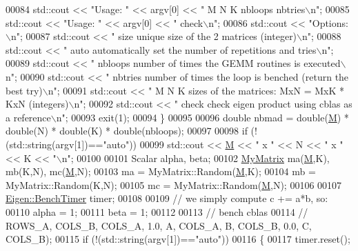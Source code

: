 \begin{DoxyCode}
{{{00084     std::cout << \textcolor{stringliteral}{"Usage: "} << argv[0] << \textcolor{stringliteral}{" M N K nbloops nbtries\(\backslash\)n"};
00085     std::cout << \textcolor{stringliteral}{"Usage: "} << argv[0] << \textcolor{stringliteral}{" check\(\backslash\)n"};
00086     std::cout << \textcolor{stringliteral}{"Options:\(\backslash\)n"};
00087     std::cout << \textcolor{stringliteral}{"    size       unique size of the 2 matrices (integer)\(\backslash\)n"};
00088     std::cout << \textcolor{stringliteral}{"    auto       automatically set the number of repetitions and tries\(\backslash\)n"};
00089     std::cout << \textcolor{stringliteral}{"    nbloops    number of times the GEMM routines is executed\(\backslash\)n"};
00090     std::cout << \textcolor{stringliteral}{"    nbtries    number of times the loop is benched (return the best try)\(\backslash\)n"};
00091     std::cout << \textcolor{stringliteral}{"    M N K      sizes of the matrices: MxN  =  MxK * KxN (integers)\(\backslash\)n"};
00092     std::cout << \textcolor{stringliteral}{"    check      check eigen product using cblas as a reference\(\backslash\)n"};
00093     exit(1);
00094   \}
00095 
00096   \textcolor{keywordtype}{double} nbmad = double(\hyperlink{group___core___module_class_eigen_1_1_matrix}{M}) * double(N) * double(K) * double(nbloops);
00097 
00098   \textcolor{keywordflow}{if} (!(std::string(argv[1])==\textcolor{stringliteral}{"auto"}))
00099     std::cout << \hyperlink{group___core___module_class_eigen_1_1_matrix}{M} << \textcolor{stringliteral}{" x "} << N << \textcolor{stringliteral}{" x "} << K << \textcolor{stringliteral}{"\(\backslash\)n"};
00100 
00101   Scalar alpha, beta;
00102   \hyperlink{group___core___module_class_eigen_1_1_matrix}{MyMatrix} ma(\hyperlink{group___core___module_class_eigen_1_1_matrix}{M},K), mb(K,N), mc(\hyperlink{group___core___module_class_eigen_1_1_matrix}{M},N);
00103   ma = MyMatrix::Random(\hyperlink{group___core___module_class_eigen_1_1_matrix}{M},K);
00104   mb = MyMatrix::Random(K,N);
00105   mc = MyMatrix::Random(\hyperlink{group___core___module_class_eigen_1_1_matrix}{M},N);
00106 
00107   \hyperlink{class_eigen_1_1_bench_timer}{Eigen::BenchTimer} timer;
00108 
00109   \textcolor{comment}{// we simply compute c += a*b, so:}
00110   alpha = 1;
00111   beta = 1;
00112 
00113   \textcolor{comment}{// bench cblas}
00114   \textcolor{comment}{// ROWS\_A, COLS\_B, COLS\_A, 1.0,  A, COLS\_A, B, COLS\_B, 0.0, C, COLS\_B);}
00115   \textcolor{keywordflow}{if} (!(std::string(argv[1])==\textcolor{stringliteral}{"auto"}))
00116   \{
00117     timer.reset();
}}}
\end{DoxyCode}

